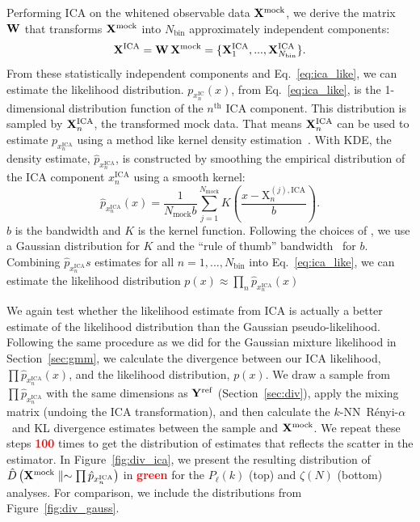 \documentclass[12pt, letterpaper, preprint]{aastex}
\newcommand{\beq}{\begin{equation}}
\newcommand{\eeq}{\end{equation}}
\newcommand{\todo}[1]{{\bf \textcolor{red}{#1}}}
\newcommand{\Xmock}{{\bf X}^\mathrm{mock}}
\newcommand{\Yref}{{\bf Y}^\mathrm{ref}}
\newcommand{\Ralpha}{R\'enyi-$\alpha$}
\begin{document}
Performing ICA on the whitened observable data $\Xmock$, we derive the 
matrix ${\bf W}$ that transforms $\Xmock$ into $N_\mathrm{bin}$
approximately independent components: 
\beq
{\bf X}^\mathrm{ICA} = {\bf W}\,\Xmock = \{{\bf X}^\mathrm{ICA}_1, ..., {\bf X}^\mathrm{ICA}_{N_\mathrm{bin}}\}.
\eeq
From these statistically independent components and Eq.~\ref{eq:ica_like}, 
we can estimate the likelihood distribution. $p_{x^\mathrm{IC}_n} (x)$, 
from Eq.~\ref{eq:ica_like}, is the 1-dimensional distribution 
function of the $n^\mathrm{th}$ ICA component. This distribution 
is sampled by ${\bf X}^\mathrm{ICA}_n$, the transformed mock data. 
That means ${\bf X}^\mathrm{ICA}_n$ can be used to estimate 
$p_{x^\mathrm{ICA}_n}$ using a method like kernel 
density estimation~\citep[KDE; \emph{e.g.}][]{9780387848587,feigelson2012}. 
With KDE, the density estimate, $\hat{p}_{x^\mathrm{ICA}_n}$, is constructed by 
smoothing the empirical distribution of the ICA component $x^\mathrm{ICA}_n$ 
using a smooth kernel: 
\beq
\hat{p}_{x^\mathrm{ICA}_n}(x) = \frac{1}{N_\mathrm{mock}b} \sum\limits_{j=1}^{N_\mathrm{mock}} K \left( \frac{x - \mathrm{X}^{(j),\mathrm{ICA}}_n}{b} \right). 
\eeq
$b$ is the bandwidth and $K$ is the kernel function. Following the 
choices of \cite{hartlap2009}, we use a Gaussian distribution for $K$ and the 
``rule of thumb'' bandwidth~\cite[also known as Scott's rule;][]{scott1992,davison2008} 
for $b$. Combining $\hat{p}_{x^\mathrm{ICA}_n}s$ estimates for 
all $n = 1, ..., N_\mathrm{bin}$ into Eq.~\ref{eq:ica_like}, we 
can estimate the likelihood distribution $p(x) \approx \prod\limits_n \hat{p}_{x^\mathrm{ICA}_n}(x)$

We again test whether the likelihood estimate from ICA is actually 
a better estimate of the likelihood distribution than the Gaussian 
pseudo-likelihood. Following the same procedure as we 
did for the Gaussian mixture likelihood in Section~\ref{sec:gmm}, we 
calculate the divergence between our ICA likelihood, $\prod \hat{p}_{x^\mathrm{ICA}_n}(x)$, 
and the likelihood distribution, $p(x)$. We draw a sample from 
$\prod \hat{p}_{x^\mathrm{ICA}_n}$ with the same dimensions as 
$\Yref$ (Section~\ref{sec:div}), apply the mixing matrix 
(undoing the ICA transformation), and then calculate the 
$k$-NN~\Ralpha~and KL divergence estimates between the sample and $\Xmock$. 
We repeat these steps \todo{100} times to get the distribution of estimates 
that reflects the scatter in the estimator. In Figure~\ref{fig:div_ica}, 
we present the resulting distribution of 
$\hat{D}\left(\Xmock \parallel \sim \prod \hat{p}_{x^\mathrm{ICA}_n} \right)$
in \todo{green} for the $P_\ell(k)$ (top) and $\zeta(N)$ (bottom) analyses. 
For comparison, we include the distributions from Figure~\ref{fig:div_gauss}. 
\end{document}
